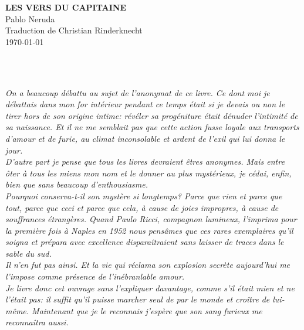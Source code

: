 \documentclass[11pt,a4paper]{book}
\begin{document}
\thispagestyle{empty}
\vspace*{70mm}
\begin{center}
\textbf{\Huge LES VERS DU CAPITAINE} \\
\vspace*{10mm}
{\LARGE Pablo Neruda} \\
\vspace*{10mm}
Traduction de Christian Rinderknecht \\
\today{}
\end{center}

\cleardoublepage

 \\ \\


{\em
On a beaucoup débattu au sujet de l'anonymat de ce livre. Ce dont moi
je débattais dans mon for intérieur pendant ce temps était si je
devais ou non le tirer hors de son origine intime: révéler sa
progéniture était dénuder l'intimité de sa naissance. Et il ne me
semblait pas que cette action fusse loyale aux transports d'amour et
de furie, au climat inconsolable et ardent de l'exil qui lui donna
le jour. \\

D'autre part je pense que tous les livres devraient êtres
anonymes. Mais entre ôter à tous les miens mon nom et le donner au
plus mystérieux, je cédai, enfin, bien que sans beaucoup
d'enthousiasme. \\

Pourquoi conserva-t-il son mystère si longtemps? Parce que rien et
parce que tout, parce que ceci et parce que cela, à cause de joies
impropres, à cause de souffrances étrangères. Quand Paulo Ricci,
compagnon lumineux, l'imprima pour la première fois à Naples en 1952
nous pensâmes que ces rares exemplaires qu'il soigna et prépara avec
excellence disparaîtraient sans laisser de traces dans le sable du
sud. \\

Il n'en fut pas ainsi. Et la vie qui réclama son explosion secrète
aujourd'hui me l'impose comme présence de l'inébranlable amour. \\

Je livre donc cet ouvrage sans l'expliquer davantage, comme s'il
était mien et ne l'était pas: il suffit qu'il puisse marcher seul de
par le monde et croître de lui-même. Maintenant que je le reconnais
j'espère que son sang furieux me reconnaîtra aussi. \\ \\
}
\end{document}

